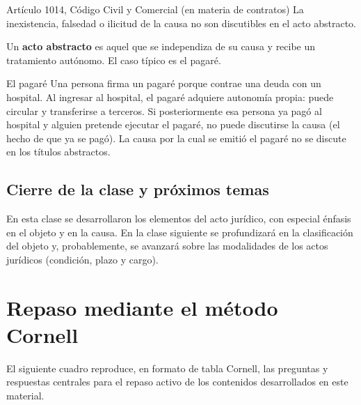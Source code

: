 \documentclass[12pt,oneside]{book}
\begin{document}
\begin{definition}{Artículo 1014, Código Civil y Comercial (en materia de contratos)}
La inexistencia, falsedad o ilicitud de la causa no son discutibles en el acto abstracto.
\end{definition}


Un \textbf{acto abstracto} es aquel que se independiza de su causa y recibe un tratamiento autónomo. El caso típico es el pagaré.

\begin{example}{El pagaré}
Una persona firma un pagaré porque contrae una deuda con un hospital. Al ingresar al hospital, el pagaré adquiere autonomía propia: puede circular y transferirse a terceros. Si posteriormente esa persona ya pagó al hospital y alguien pretende ejecutar el pagaré, no puede discutirse la causa (el hecho de que ya se pagó). La causa por la cual se emitió el pagaré no se discute en los títulos abstractos.
\end{example}

\section{Cierre de la clase y próximos temas}

En esta clase se desarrollaron los elementos del acto jurídico, con especial énfasis en el objeto y en la causa. En la clase siguiente se profundizará en la clasificación del objeto y, probablemente, se avanzará sobre las modalidades de los actos jurídicos (condición, plazo y cargo).

\chapter{Repaso mediante el método Cornell}

El siguiente cuadro reproduce, en formato de tabla Cornell, las preguntas y respuestas centrales para el repaso activo de los contenidos desarrollados en este material.
\end{document}
